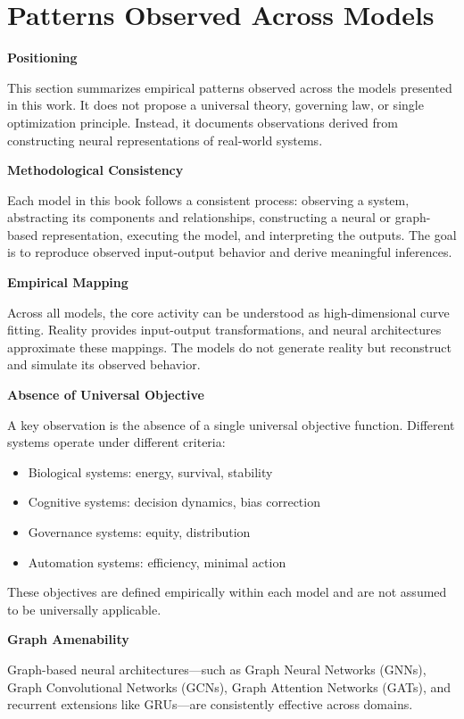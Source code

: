 \section*{Patterns Observed Across Models}

\textbf{Positioning}

This section summarizes empirical patterns observed across the models presented in this work. It does not propose a universal theory, governing law, or single optimization principle. Instead, it documents observations derived from constructing neural representations of real-world systems.

\textbf{Methodological Consistency}

Each model in this book follows a consistent process: observing a system, abstracting its components and relationships, constructing a neural or graph-based representation, executing the model, and interpreting the outputs. The goal is to reproduce observed input-output behavior and derive meaningful inferences.

\textbf{Empirical Mapping}

Across all models, the core activity can be understood as high-dimensional curve fitting. Reality provides input-output transformations, and neural architectures approximate these mappings. The models do not generate reality but reconstruct and simulate its observed behavior.

\textbf{Absence of Universal Objective}

A key observation is the absence of a single universal objective function. Different systems operate under different criteria:
\begin{itemize}
\item Biological systems: energy, survival, stability
\item Cognitive systems: decision dynamics, bias correction
\item Governance systems: equity, distribution
\item Automation systems: efficiency, minimal action
\end{itemize}

These objectives are defined empirically within each model and are not assumed to be universally applicable.

\textbf{Graph Amenability}

Graph-based neural architectures—such as Graph Neural Networks (GNNs), Graph Convolutional Networks (GCNs), Graph Attention Networks (GATs), and recurrent extensions like GRUs—are consistently effective across domains.

